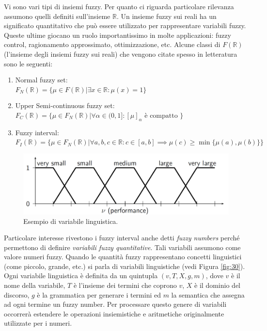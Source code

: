 \documentclass[10pt,a4paper]{article}
\begin{document}
Vi sono vari tipi di insiemi fuzzy. Per quanto ci riguarda particolare rilevanza assumono quelli definiti sull'insieme $\mathbb{R}$. Un insieme fuzzy sui reali ha un significato quantitativo che può essere utilizzato per rappresentare variabili fuzzy. Queste ultime giocano un ruolo importantissimo in molte applicazioni: fuzzy control, ragionamento approssimato, ottimizzazione, etc. Alcune classi di $F(\mathbb{R})$ (l'insieme degli insiemi fuzzy sui reali) che vengono citate spesso in letteratura sono le seguenti:
\begin{enumerate}
\item{Normal fuzzy set: \\ $F_N(\mathbb{R}) = \{\mu \in F(\mathbb{R}) | \exists x \in \mathbb{R} : \mu(x) = 1 \}$}
\item{Upper Semi-continuous fuzzy set: \\$F_C(\mathbb{R}) = \{\mu \in F_N(\mathbb{R}) | \forall \alpha \in (0,1] : [\mu]_\alpha \text{ è compatto }\}$}
\item{Fuzzy interval: \\ $F_I(\mathbb{R}) = \{\mu \in F_N(\mathbb{R}) | \forall a,b,c \in \mathbb{R} : c \in [a,b] \implies \mu(c) \geq \min\{ \mu(a),\mu(b) \} \}$}
\end{enumerate}

\begin{figure}
\centering
\includegraphics[scale=0.3]{img/lingvar.png}
\caption{Esempio di variabile linguistica.}
\label{fig:29}
\end{figure}

Particolare interesse rivestono i fuzzy interval anche detti \emph{fuzzy numbers} perché permettono di definire \emph{variabili fuzzy quantitative}. Tali variabili assumono come valore numeri fuzzy. Quando le quantità fuzzy rappresentano concetti linguistici (come piccolo, grande, etc.) si parla di variabili linguistiche (vedi Figura \ref{fig:30}). Ogni variabile linguistica è definita da un quintupla $(v,T,X,g,m)$, dove $v$ è il nome della variabile, $T$ è l'insieme dei termini che coprono $v$, $X$ è il dominio del discorso, $g$ è la grammatica per generare i termini ed $m$ la semantica che assegna ad ogni termine un fuzzy number. Per processare questo genere di variabili occorrerà estendere le operazioni insiemistiche e aritmetiche originalmente utilizzate per i numeri. 
\end{document}
